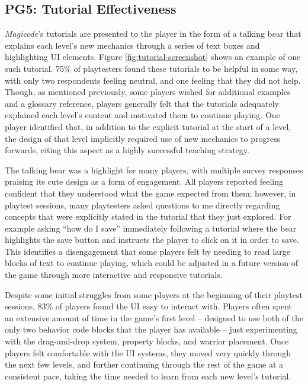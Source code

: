 \documentclass[10pt,twocolumn]{article}
\begin{document}
\subsection{PG5: Tutorial Effectiveness}
\textit{Magicode}’s tutorials are presented to the player in the form of a talking bear that explains each level’s new mechanics through a series of text boxes and highlighting UI elements. Figure \ref{fig:tutorial-screenshot} shows an example of one such tutorial. 75\% of playtesters found these tutorials to be helpful in some way, with only two respondents feeling neutral, and one feeling that they did not help. Though, as mentioned previously, some players wished for additional examples and a glossary reference, players generally felt that the tutorials adequately explained each level’s content and motivated them to continue playing. One player identified that, in addition to the explicit tutorial at the start of a level, the design of that level implicitly required use of new mechanics to progress forwards, citing this aspect as a highly successful teaching strategy.

The talking bear was a highlight for many players, with multiple survey responses praising its cute design as a form of engagement. All players reported feeling confident that they understood what the game expected from them; however, in playtest sessions, many playtesters asked questions to me directly regarding concepts that were explicitly stated in the tutorial that they just explored. For example asking “how do I save” immediately following a tutorial where the bear highlights the save button and instructs the player to click on it in order to save. This identifies a disengagement that some players felt by needing to read large blocks of text to continue playing, which could be adjusted in a future version of the game through more interactive and responsive tutorials.

Despite some initial struggles from some players at the beginning of their playtest sessions, 83\% of players found the UI easy to interact with. Players often spent an extensive amount of time in the game’s first level – designed to use both of the only two behavior code blocks that the player has available – just experimenting with the drag-and-drop system, property blocks, and warrior placement. Once players felt comfortable with the UI systems, they moved very quickly through the next few levels, and further continuing through the rest of the game at a consistent pace, taking the time needed to learn from each new level’s tutorial.
\end{document}
